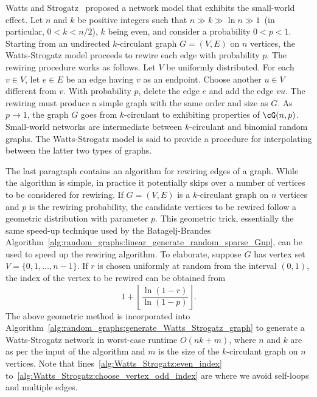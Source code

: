 Watts and
Strogatz~\cite{Watts1999a,Watts1999b,WattsStrogatz1998}
proposed a network model that exhibits the small-world effect. Let $n$
and $k$ be positive integers such that $n \gg k \gg \ln n \gg 1$~(in
particular, $0 < k < n/2$), $k$ being even, and consider a probability
$0 < p < 1$. Starting from an undirected
$k$-circulant graph $G = (V,E)$ on
$n$ vertices, the Watts-Strogatz model
proceeds to rewire each edge with probability $p$. The rewiring
procedure works as follows. Let $V$ be uniformly distributed. For each
$v \in V$, let $e \in E$ be an edge having $v$ as an endpoint. Choose
another $u \in V$ different from $v$. With probability $p$, delete the
edge $e$ and add the edge $vu$. The rewiring must produce a
simple graph with the same order and size as
$G$. As $p \to 1$, the graph $G$ goes from $k$-circulant to exhibiting
properties of $\cG(n,p)$. Small-world
networks are intermediate between $k$-circulant and binomial random
graphs. The Watts-Strogatz model is said to provide a procedure for
interpolating between the latter two types of graphs.

The last paragraph contains an algorithm for rewiring edges of a
graph. While the algorithm is simple, in practice it potentially skips
over a number of vertices to be considered for rewiring. If
$G = (V,E)$ is a $k$-circulant graph on $n$ vertices and $p$ is the
rewiring probability, the candidate vertices to be rewired follow a
geometric distribution with parameter $p$. This geometric trick,
essentially the same speed-up technique used by the Batagelj-Brandes
Algorithm~\ref{alg:random_graphs:linear_generate_random_sparse_Gnp},
can be used to speed up the rewiring algorithm. To elaborate, suppose
$G$ has vertex set $V = \{0, 1, \dots, n-1\}$. If $r$ is chosen
uniformly at random from the interval $(0,1)$, the index of the vertex
to be rewired can be obtained from
\[
1 + \left\lfloor \frac{\ln(1 - r)} {\ln(1 - p)} \right\rfloor.
\]
The above geometric method is incorporated into
Algorithm~\ref{alg:random_graphs:generate_Watts_Strogatz_graph} to
generate a Watts-Strogatz network in worst-case runtime
$O(nk + m)$, where $n$ and $k$ are as per the input of the algorithm
and $m$ is the size of the $k$-circulant graph on $n$ vertices. Note
that lines~\ref{alg:Watts_Strogatz:even_index}
to~\ref{alg:Watts_Strogatz:choose_vertex_odd_index} are where we avoid
self-loops and multiple edges.

